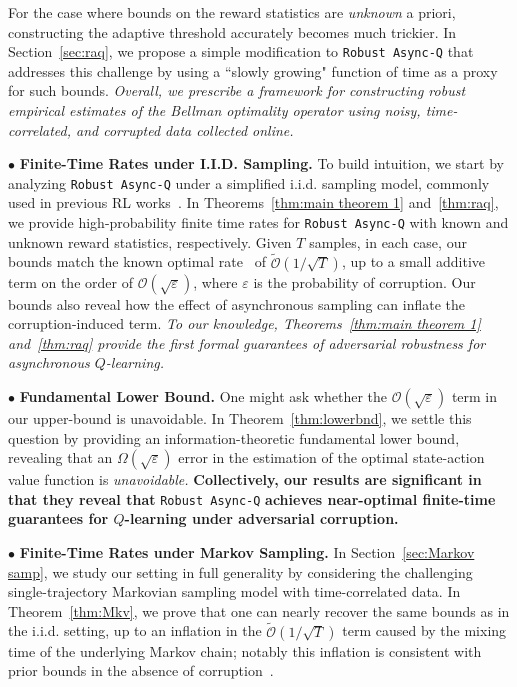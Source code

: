 \documentclass{article}
\newcommand{\mc}{\mathcal}
\begin{document}
For the case where bounds on the reward statistics are \emph{unknown} a priori, constructing the adaptive threshold accurately becomes much trickier. In Section~\ref{sec:raq}, we propose a simple modification to \texttt{Robust Async-Q} that addresses this challenge by using a ``slowly growing" function of time as a proxy for such bounds. \emph{Overall, we prescribe a framework for constructing robust empirical estimates of the Bellman optimality operator using noisy, time-correlated, and corrupted data collected online.} 

$\bullet$ \textbf{Finite-Time Rates under I.I.D. Sampling.} To build intuition, we start by analyzing \texttt{Robust Async-Q} under a simplified i.i.d. sampling model, commonly used in previous RL works~\cite{korda, dalal, narayanan, lakshmi}. In Theorems~\ref{thm:main theorem 1} and~\ref{thm:raq}, we provide high-probability finite time rates for \texttt{Robust Async-Q} with known and unknown reward statistics, respectively. Given $T$ samples, in each case, our bounds match the known optimal rate~\cite{wainwright, Qu, li2024q} of $\widetilde{\mc{O}}(1/\sqrt{T})$, up to a small additive term on the order of $\mc{O}(\sqrt{\varepsilon})$, where ${\varepsilon}$ is the probability of corruption. Our bounds also reveal how the effect of asynchronous sampling can inflate the corruption-induced term. \emph{To our knowledge, Theorems~\ref{thm:main theorem 1} and~\ref{thm:raq} provide the first formal guarantees of adversarial robustness for asynchronous \(Q\)-learning.} 

$\bullet$ \textbf{Fundamental Lower Bound.} One might ask whether the $\mc{O}(\sqrt{\varepsilon})$ term in our upper-bound is unavoidable. In Theorem~\ref{thm:lowerbnd}, we settle this question by providing an information-theoretic fundamental lower bound,  revealing that an $\Omega(\sqrt{\varepsilon})$ error in the estimation of the optimal state-action value function is \emph{unavoidable.} \textbf{Collectively, our results are significant in that they reveal that} \texttt{Robust Async-Q} \textbf{achieves near-optimal finite-time guarantees for \(Q\)-learning under adversarial corruption.} 

$\bullet$ \textbf{Finite-Time Rates under Markov Sampling.} In Section~\ref{sec:Markov samp}, we study our setting in full generality by considering the challenging single-trajectory Markovian sampling model with time-correlated data. In Theorem~\ref{thm:Mkv}, we prove that one can nearly recover the same bounds as in the i.i.d. setting, up to an inflation in the $\widetilde{\mc{O}}(1/\sqrt{T})$ term caused by the mixing time of the underlying Markov chain; notably this inflation is consistent with prior bounds in the absence of corruption~\cite{Qu}. 
\end{document}

